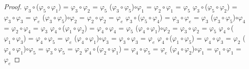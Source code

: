 \documentclass[10pt,a4paper,oneside]{article}
\begin{document}
\begin{proof}
					$\varphi_{3}\circ$($\varphi_{5}\circ\varphi_{1}$) = $\varphi_{3}\circ\varphi_{2}$ = $\varphi_{5}$
					\newline
					($\varphi_{3}\circ\varphi_{5}$)$\circ\varphi_{1}$ = $\varphi_{2}\circ\varphi_{1}$ = $\varphi_{5}$
					\newline
					\newline
					$\varphi_{3}\circ$($\varphi_{5}\circ\varphi_{2}$) = $\varphi_{3}\circ\varphi_{3}$ = $\varphi_{e}$
					\newline
					($\varphi_{3}\circ\varphi_{5}$)$\circ\varphi_{2}$ = $\varphi_{2}\circ\varphi_{2}$ = $\varphi_{e}$
					\newline
					\newline
					$\varphi_{3}\circ$($\varphi_{5}\circ\varphi_{4}$) = $\varphi_{3}\circ\varphi_{e}$ = $\varphi_{3}$
					\newline
					($\varphi_{3}\circ\varphi_{5}$)$\circ\varphi_{4}$ = $\varphi_{2}\circ\varphi_{4}$ = $\varphi_{3}$
					\newline
					\newline
					$\varphi_{4}\circ$($\varphi_{1}\circ\varphi_{2}$) = $\varphi_{4}\circ\varphi_{4}$ = $\varphi_{5}$
					\newline
					($\varphi_{4}\circ\varphi_{1}$)$\circ\varphi_{2}$ = $\varphi_{3}\circ\varphi_{2}$ = $\varphi_{5}$
					\newline
					\newline
					$\varphi_{4}\circ$($\varphi_{1}\circ\varphi_{3}$) = $\varphi_{4}\circ\varphi_{5}$ = $\varphi_{e}$
					\newline
					($\varphi_{4}\circ\varphi_{1}$)$\circ\varphi_{3}$ = $\varphi_{3}\circ\varphi_{3}$ = $\varphi_{e}$
					\newline
					\newline
					$\varphi_{4}\circ$($\varphi_{1}\circ\varphi_{5}$) = $\varphi_{4}\circ\varphi_{3}$ = $\varphi_{2}$
					\newline
					($\varphi_{4}\circ\varphi_{1}$)$\circ\varphi_{5}$ = $\varphi_{3}\circ\varphi_{5}$ = $\varphi_{2}$
					\newline
					\newline
					$\varphi_{4}\circ$($\varphi_{2}\circ\varphi_{1}$) = $\varphi_{4}\circ\varphi_{5}$ = $\varphi_{e}$
					\newline
					($\varphi_{4}\circ\varphi_{2}$)$\circ\varphi_{1}$ = $\varphi_{1}\circ\varphi_{1}$ = $\varphi_{e}$
					\newline
					\newline

\end{proof}
\end{document}
